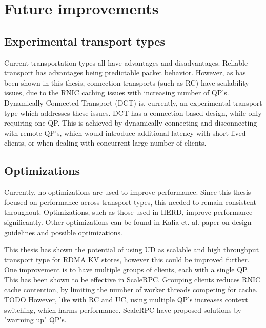 
\chapter{Future improvements}\label{ch:future-improvements} %



\ifpdf
    \graphicspath{{7/figures/PNG/}{7/figures/PDF/}{7/figures/}}
\else
    \graphicspath{{7/figures/EPS/}{7/figures/}}
\fi


%
\section{Experimental transport types}
Current transportation types all have advantages and disadvantages.
Reliable transport has advantages being predictable packet behavior.
However, as has been shown in this thesis, connection transports (such as RC) have scalability issues, due to the RNIC caching issues with increasing number of QP's.
Dynamically Connected Transport (DCT) is, currently, an experimental transport type which addresses these issues.
DCT has a connection based design, while only requiring one QP.
This is achieved by dynamically connecting and disconnecting with remote QP's, which would introduce additional latency with short-lived clients, or when dealing with concurrent large number of clients.

\section{Optimizations}
Currently, no optimizations are used to improve performance.
Since this thesis focused on performance across transport types, this needed to remain consistent throughout.
Optimizations, such as those used in HERD, improve performance significantly.
Other optimizations can be found in Kalia et. al. paper on design guidelines and possible optimizations\cite{kalia2016design}.

This thesis has shown the potential of using UD as scalable and high throughput transport type for RDMA KV stores, however this could be improved further.
One improvement is to have multiple groups of clients, each with a single QP.
This has been shown to be effective in ScaleRPC\cite{chen2019scalable}.
Grouping clients reduces RNIC cache contention, by limiting the number of worker threads competing for cache. TODO
However, like with RC and UC, using multiple QP's increases context switching, which harms performance.
ScaleRPC have proposed solutions by "warming up" QP's.


